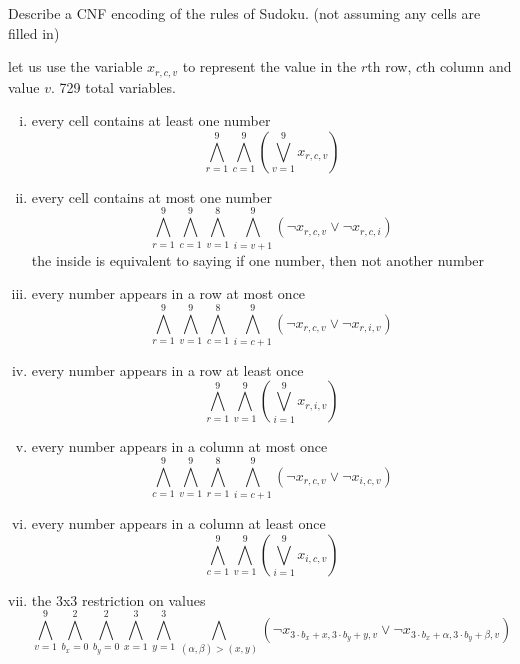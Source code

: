 \documentclass[11pt]{article}
\begin{document}
\begin{qunlist}
  \begin{qparts}
  \item
    Describe a CNF encoding of the rules of Sudoku. (not assuming any cells are filled in)

    \begin{answer}
      let us use the variable \(x_{r,c,v}\) to represent the value in the \(r\)th row, \(c\)th column and value \(v\). 729 total variables.

      \begin{enumerate}[i.]
        \item every cell contains at least one number
          \begin{equation}
            \bigwedge_{r=1}^{9} \bigwedge_{c=1}^{9} \left( \bigvee_{v=1}^9 x_{r,c,v} \right)
          \end{equation}
        \item every cell contains at most one number
          \begin{equation}
            \bigwedge_{r=1}^{9} \bigwedge_{c=1}^{9} \bigwedge_{v=1}^{8} \bigwedge_{i=v+1}^{9} \left( \neg x_{r,c,v} \lor \neg x_{r,c,i} \right)
          \end{equation}
          the inside is equivalent to saying if one number, then not another number
        \item every number appears in a row at most once
          \begin{equation}
            \bigwedge_{r=1}^{9} \bigwedge_{v=1}^{9} \bigwedge_{c=1}^{8} \bigwedge_{i=c+1}^{9} \left( \neg x_{r,c,v} \lor \neg x_{r,i,v} \right)
          \end{equation}
        \item every number appears in a row at least once
          \begin{equation}
            \bigwedge_{r=1}^{9} \bigwedge_{v=1}^{9} \left( \bigvee_{i=1}^9x_{r,i,v} \right)
          \end{equation}
        \item every number appears in a column at most once
          \begin{equation}
            \bigwedge_{c=1}^{9} \bigwedge_{v=1}^{9} \bigwedge_{r=1}^{8} \bigwedge_{i=c+1}^{9} \left( \neg x_{r,c,v} \lor \neg x_{i,c,v} \right)
          \end{equation}
        \item every number appears in a column at least once
          \begin{equation}
            \bigwedge_{c=1}^{9} \bigwedge_{v=1}^{9} \left( \bigvee_{i=1}^9x_{i,c,v}\right)
          \end{equation}
        \item the 3x3 restriction on values
          \begin{equation}
            \bigwedge_{v=1}^{9} \bigwedge_{b_x=0}^{2} \bigwedge_{b_y=0}^{2} \bigwedge_{x=1}^{3} \bigwedge_{y=1}^{3} \bigwedge_{(\alpha,\beta) > (x,y)} \left( \neg x_{3 \cdot b_x + x, 3 \cdot b_y + y, v} \lor \neg x_{3 \cdot b_x + \alpha, 3 \cdot b_y + \beta, v} \right)
          \end{equation}


\end{enumerate}
\end{answer}
\end{qparts}
\end{qunlist}
\end{document}
